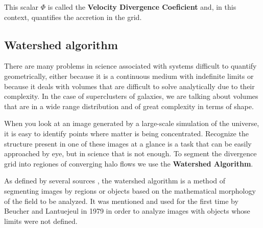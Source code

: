This scalar $\Phi$ is called the \textbf{Velocity Divergence Coeficient} and, in this context,   quantifies the accretion in the grid.



\subsection{Watershed algorithm}
\label{sec:INTROWatershed}
 There are many problems in science associated with systems difficult to quantify geometrically, either because it is a continuous medium with indefinite limits or because it deals with volumes that are difficult to solve analytically due to their complexity. In the case of superclusters of galaxies, we are talking about volumes that are in a wide range distribution and of great complexity in terms of shape. 

 When you look at an image generated by a large-scale simulation of the universe, it is easy to identify points where matter is being concentrated. Recognize the structure present in one of these images at a glance is a task that can be easily approached by eye, but in science that is not enough.
To segment the divergence grid into regiones of converging halo flows we use the \textbf{Watershed Algorithm}.


As defined by several sources \cite{DelaunayTessellations_Schaap} \cite{BeucherSegmetation}, the watershed algorithm is a method of segmenting images by regions or objects based on the mathematical morphology of the field to be analyzed. It was mentioned and used for the first time by Beucher and Lantuejeul\cite{BeucherWatershed1979} in 1979 in order to analyze images with objects whose limits were not defined.

